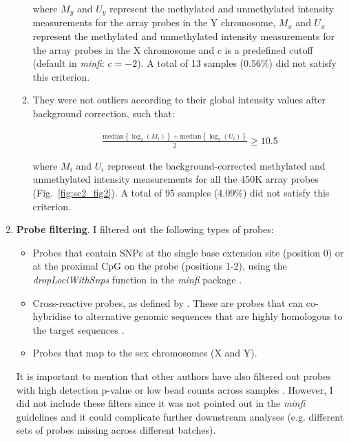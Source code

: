 \begin{enumerate}
\begin{enumerate}
			where $M_{y}$ and $U_{y}$ represent the methylated and unmethylated intensity measurements for the array probes in the Y chromosome, $M_{x}$ and $U_{x}$ represent the methylated and unmethylated intensity measurements for the array probes in the X chromosome and $c$ is a predefined cutoff (default in \textit{minfi}: $c=-2$). A total of 13 samples (0.56\%) did not satisfy this criterion.
			
			\smallskip
			
			\item They were not outliers according to their global intensity values after background correction, such that:
			
			\begin{align}
			\frac{\mathrm{median}\left\{\log_2(M_{i})\right\} + \mathrm{median}\left\{\log_2(U_{i})\right\}}{2} \geq 10.5
			\end{align}
			
			where $M_{i}$ and $U_{i}$ represent the background-corrected methylated and unmethylated intensity measurements for all the 450K array probes (Fig.~\ref{fig:sc2_fig2}). A total of 95 samples (4.09\%) did not satisfy this criterion. 
			
		\end{enumerate} 
	
	\item \textbf{Probe filtering}. I filtered out the following types of probes:
	
	\begin{itemize}
		
		\item Probes that contain \acrshort{SNP}s at the single base extension site (position 0) or at the proximal CpG on the probe (positions 1-2), using the \textit{dropLociWithSnps} function in the \textit{minfi} package \citep{Aryee2014}. 
		
		\item Cross-reactive probes, as defined by \citet{Chen2013}. These are probes that can co-hybridise to alternative genomic sequences that are highly homologous to the target sequences \citep{Chen2013}.  
		
		\item  Probes that map to the sex chromosomes (X and Y).
	
	\end{itemize}
	
	It is important to mention that other authors have also filtered out probes with high detection p-value or low bead counts across samples \citep{Wilhelm-Benartzi2013,Morris2015}. However, I did not include these filters since it was not pointed out in the \textit{minfi} guidelines \citep{Aryee2014,Fortin2015} and it could complicate further downstream analyses (e.g. different sets of probes missing across different batches).     
	

\end{enumerate}

